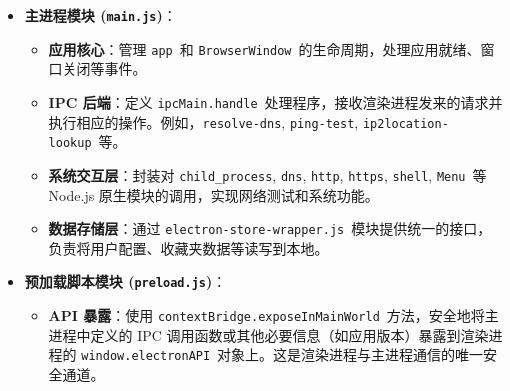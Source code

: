 \documentclass{article}
\begin{document}
\begin{itemize}
    \item \textbf{主进程模块 (\texttt{main.js})}：
    \begin{itemize}
        \item \textbf{应用核心}：管理 \texttt{app}\ 和 \texttt{BrowserWindow}\ 的生命周期，处理应用就绪、窗口关闭等事件。
        \item \textbf{IPC 后端}：定义 \texttt{ipcMain.handle}\ 处理程序，接收渲染进程发来的请求并执行相应的操作。例如，\texttt{resolve-dns}, \texttt{ping-test}, \texttt{ip2location-lookup}\ 等。
        \item \textbf{系统交互层}：封装对 \texttt{child\_process}, \texttt{dns}, \texttt{http}, \texttt{https}, \texttt{shell}, \texttt{Menu}\ 等 Node.js 原生模块的调用，实现网络测试和系统功能。
        \item \textbf{数据存储层}：通过 \texttt{electron-store-wrapper.js}\ 模块提供统一的接口，负责将用户配置、收藏夹数据等读写到本地。
    \end{itemize}

    \item \textbf{预加载脚本模块 (\texttt{preload.js})}：
    \begin{itemize}
        \item \textbf{API 暴露}：使用 \texttt{contextBridge.exposeInMainWorld}\ 方法，安全地将主进程中定义的 IPC 调用函数或其他必要信息（如应用版本）暴露到渲染进程的 \texttt{window.electronAPI}\ 对象上。这是渲染进程与主进程通信的唯一安全通道。
    \end{itemize}


\end{itemize}
\end{document}
